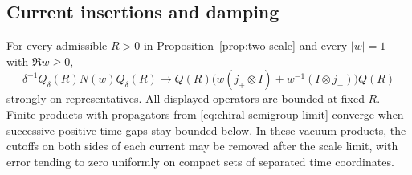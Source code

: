\subsection{Current insertions and damping}

\begin{lemma}\label{lem:current-limit}
For every admissible $R>0$ in Proposition~\ref{prop:two-scale} and every
$|w|=1$ with $\Re w\ge0$,
\begin{equation}\label{eq:chiral-current-limit}
 \delta^{-1}Q_\delta(R)N(w)Q_\delta(R)
 \longrightarrow
 Q(R)\bigl(w(j_+\otimes I)+w^{-1}(I\otimes j_-)\bigr)Q(R)
\end{equation}
strongly on representatives. All displayed operators are bounded at fixed
$R$. Finite products with propagators from
\eqref{eq:chiral-semigroup-limit} converge when successive positive time
gaps stay bounded below. In these vacuum products, the cutoffs on both
sides of each current may be removed after the scale limit, with error
tending to zero uniformly on compact sets of separated time coordinates.
\end{lemma}

